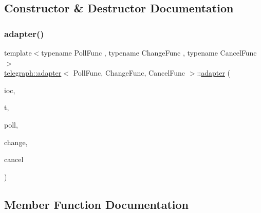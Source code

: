 \subsection{Constructor \& Destructor Documentation}
\mbox{\label{classtelegraph_1_1adapter_a01578ea2a59c672e85b7c400d4b70817}} 
\subsubsection{\texorpdfstring{adapter()}{adapter()}}
{\footnotesize\ttfamily template$<$typename Poll\+Func , typename Change\+Func , typename Cancel\+Func $>$ \\
\hyperlink{classtelegraph_1_1adapter}{telegraph\+::adapter}$<$ Poll\+Func, Change\+Func, Cancel\+Func $>$\+::\hyperlink{classtelegraph_1_1adapter}{adapter} (\begin{DoxyParamCaption}\item[{io\+::io\+\_\+context \&}]{ioc,  }\item[{\hyperlink{classtelegraph_1_1value__type}{value\+\_\+type}}]{t,  }\item[{Poll\+Func}]{poll,  }\item[{Change\+Func}]{change,  }\item[{Cancel\+Func}]{cancel }\end{DoxyParamCaption})\hspace{0.3cm}{\ttfamily [inline]}}



\subsection{Member Function Documentation}
\mbox{\label{classtelegraph_1_1adapter_a0b9c93d0584817ca7dfd74f4ae38ebad}} 
